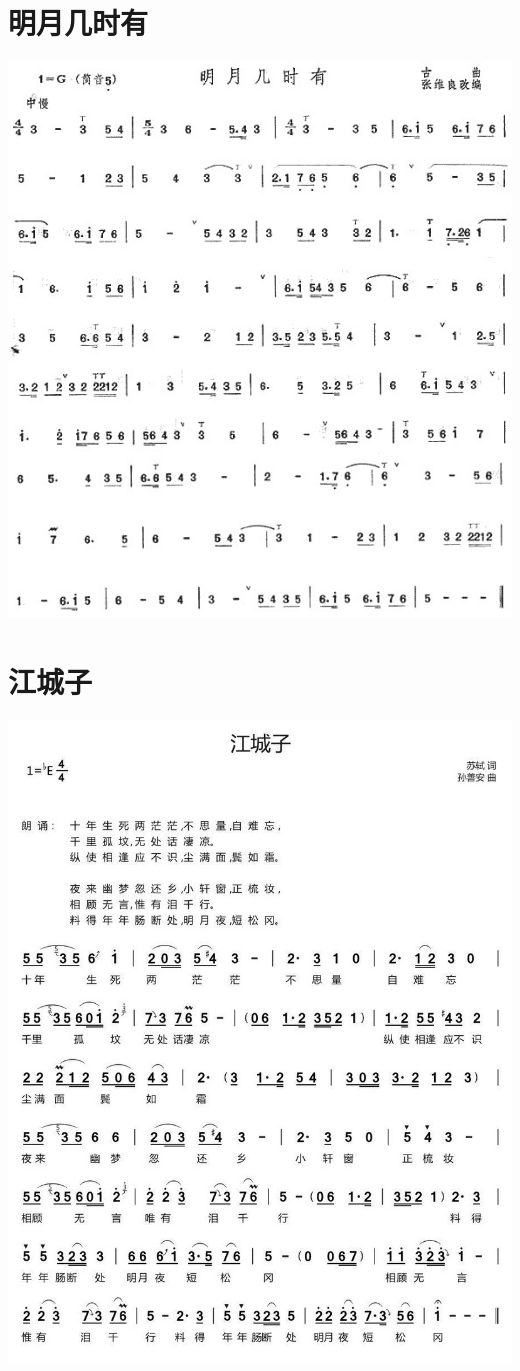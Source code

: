 \documentclass[cn,pad,twocol]{elegantbook}
\begin{document}
\section{明月几时有}                \includegraphics[width=\textwidth]{rpi400/20201230明月几时有.jpg}
\section{江城子}                    \includegraphics[width=\textwidth]{rpi400/20201230江城子.jpg}
\end{document}
